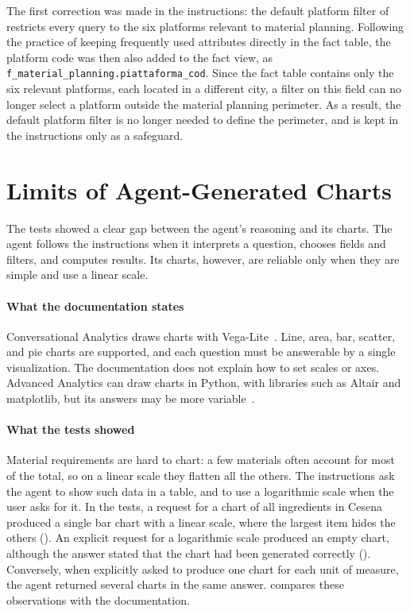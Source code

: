 The first correction was made in the instructions: the default platform filter of  restricts every query to the six platforms relevant to material planning. Following the practice of keeping frequently used attributes directly in the fact table, the platform code was then also added to the fact view, as \texttt{f\_material\_planning.\allowbreak piattaforma\_cod}. Since the fact table contains only the six relevant platforms, each located in a different city, a filter on this field can no longer select a platform outside the material planning perimeter. As a result, the default platform filter is no longer needed to define the perimeter, and is kept in the instructions only as a safeguard.

\section{Limits of Agent-Generated Charts}
\label{sec:visualization_governance}

The tests showed a clear gap between the agent's reasoning and its charts. The agent follows the instructions when it interprets a question, chooses fields and filters, and computes results. Its charts, however, are reliable only when they are simple and use a linear scale.

\paragraph{What the documentation states}
Conversational Analytics draws charts with Vega-Lite~\cite{googlecloudlookercaoverview2026, vegalite2026}. Line, area, bar, scatter, and pie charts are supported, and each question must be answerable by a single visualization. The documentation does not explain how to set scales or axes. Advanced Analytics can draw charts in Python, with libraries such as Altair and matplotlib, but its answers may be more variable~\cite{googlecloudlookeraa2026}.

\paragraph{What the tests showed}
Material requirements are hard to chart: a few materials often account for most of the total, so on a linear scale they flatten all the others. The instructions ask the agent to show such data in a table, and to use a logarithmic scale when the user asks for it. In the tests, a request for a chart of all ingredients in Cesena produced a single bar chart with a linear scale, where the largest item hides the others (). An explicit request for a logarithmic scale produced an empty chart, although the answer stated that the chart had been generated correctly (). Conversely, when explicitly asked to produce one chart for each unit of measure, the agent returned several charts in the same answer.  compares these observations with the documentation.

